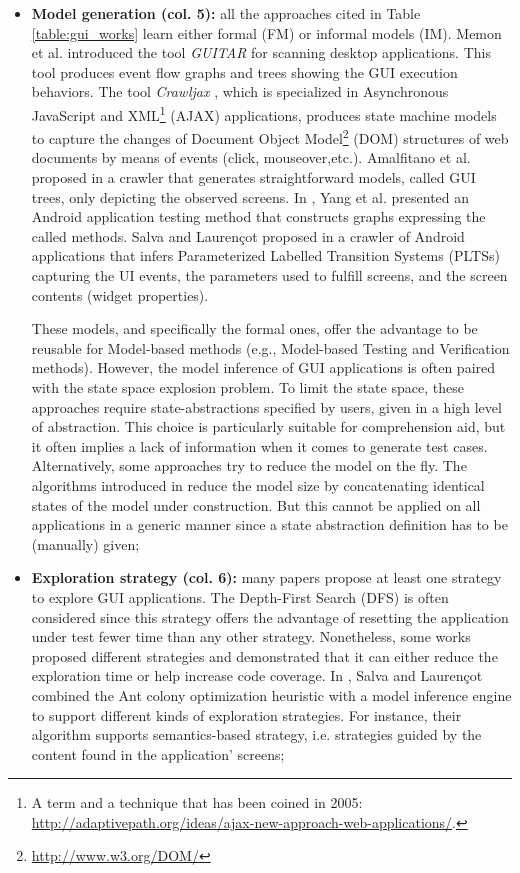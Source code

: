 \begin{itemize}
	\item \textbf{Model generation (col. 5):} all the approaches
	cited in Table \ref{table:gui_works} learn either formal
	(FM) or informal models (IM). Memon et al. \cite{guitar}
	introduced the tool \textit{GUITAR} for scanning desktop
	applications. This tool produces event flow graphs and trees
	showing the GUI execution behaviors. The tool
	\textit{Crawljax} \cite{crawljax:tweb12}, which is
	specialized in Asynchronous JavaScript and XML\footnote{A term and a technique that has been coined in 2005: \url{http://adaptivepath.org/ideas/ajax-new-approach-web-applications/}.} (AJAX) applications, produces state machine
	models to capture the changes of Document Object Model\footnote{\url{http://www.w3.org/DOM/}} (DOM)
	structures of web documents by means of events (click,
	mouseover,etc.).
	Amalfitano et al. proposed in
	\cite{Amalfitano:2012:UGR:2351676.2351717} a crawler that
	generates straightforward models, called GUI trees, only
	depicting the observed screens. In \cite{WPX13}, Yang et al.
	presented an Android application testing method that
	constructs graphs expressing the called methods. Salva and
	Laurençot proposed in \cite{SP15} a crawler of Android
	applications that infers Parameterized Labelled Transition
	Systems (PLTSs) capturing the UI events, the parameters used
	to fulfill screens, and the screen contents (widget
	properties).

	These models, and specifically the formal ones, offer the
	advantage to be reusable for Model-based methods
	(e.g., Model-based Testing and Verification methods).
	However, the model inference of GUI applications is often
	paired with the state space explosion problem. To limit the
	state space, these approaches
	\cite{MobiGUITARIEEESoftware2014,guitar,5954416,WPX13,SP15}
	require state-abstractions specified by users, given in a
	high level of abstraction. This choice is particularly
	suitable for comprehension aid, but it often implies a lack
	of information when it comes to generate test cases.
	Alternatively, some approaches try to reduce the model on
	the fly. The algorithms introduced in
	\cite{crawljax:tweb12,4656395} reduce the model size by
	concatenating identical states of the model under
	construction.  But this cannot be  applied on all
	applications in a generic manner since a state abstraction
	definition has to be (manually) given;

	\item \textbf{Exploration strategy (col. 6):} many
	papers propose at least one strategy to explore GUI
	applications. The Depth-First Search (DFS) is often
	considered since this strategy offers the advantage of
	resetting the application under test fewer time than any other
	strategy. Nonetheless, some works proposed different strategies
	\cite{Amalfitano:2012:UGR:2351676.2351717,5954416,crawljax:tweb12,WPX13}
	and demonstrated that it can either reduce the exploration
	time or help increase code coverage. In \cite{SP15}, Salva
	and Laurençot combined the Ant colony optimization heuristic
	with a model inference engine to support different kinds of
	exploration strategies. For instance, their algorithm
	supports semantics-based strategy, i.e. strategies guided by
	the content found in the application' screens;


\end{itemize}
